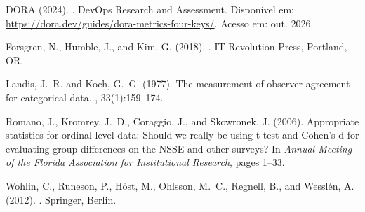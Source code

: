 \begin{thebibliography}{}

DORA (2024).
.
\newblock DevOps Research and Assessment. Disponível em:
  \url{https://dora.dev/guides/dora-metrics-four-keys/}. Acesso em: out. 2026.

Forsgren, N., Humble, J., and Kim, G. (2018).
.
\newblock IT Revolution Press, Portland, OR.

Landis, J.~R. and Koch, G.~G. (1977).
\newblock The measurement of observer agreement for categorical data.
, 33(1):159--174.

Romano, J., Kromrey, J.~D., Coraggio, J., and Skowronek, J. (2006).
\newblock Appropriate statistics for ordinal level data: Should we really be using
  t-test and Cohen's d for evaluating group differences on the NSSE and other surveys?
\newblock In {\em Annual Meeting of the Florida Association for Institutional
  Research}, pages 1--33.

Wohlin, C., Runeson, P., H{\"o}st, M., Ohlsson, M.~C., Regnell, B., and Wessl{\'e}n,
  A. (2012).
.
\newblock Springer, Berlin.

\end{thebibliography}
